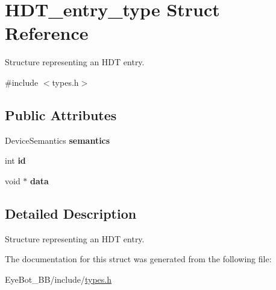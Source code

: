 \hypertarget{struct_h_d_t__entry__type}{\section{\-H\-D\-T\-\_\-entry\-\_\-type \-Struct \-Reference}
\label{struct_h_d_t__entry__type}
}


\-Structure representing an \-H\-D\-T entry.  




{\ttfamily \#include $<$types.\-h$>$}

\subsection*{\-Public \-Attributes}
\begin{DoxyCompactItemize}
\item 
\hypertarget{struct_h_d_t__entry__type_a6eb0b6dd6dd4b1eeb0ca05f718331201}{\-Device\-Semantics {\bfseries semantics}}\label{struct_h_d_t__entry__type_a6eb0b6dd6dd4b1eeb0ca05f718331201}

\item 
\hypertarget{struct_h_d_t__entry__type_ab3420ab7354c958fb12ad1b049c3eef6}{int {\bfseries id}}\label{struct_h_d_t__entry__type_ab3420ab7354c958fb12ad1b049c3eef6}

\item 
\hypertarget{struct_h_d_t__entry__type_acbbabd1dd0bdd76dcccd67be78f1649c}{void $\ast$ {\bfseries data}}\label{struct_h_d_t__entry__type_acbbabd1dd0bdd76dcccd67be78f1649c}

\end{DoxyCompactItemize}


\subsection{\-Detailed \-Description}
\-Structure representing an \-H\-D\-T entry. 

\-The documentation for this struct was generated from the following file\-:\begin{DoxyCompactItemize}
\item 
\-Eye\-Bot\-\_\-\-B\-B/include/\hyperlink{types_8h}{types.\-h}\end{DoxyCompactItemize}
